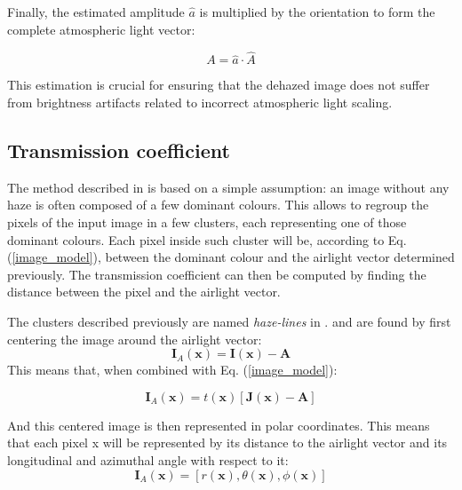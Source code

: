 \documentclass[conference]{IEEEtran}
\begin{document}
Finally, the estimated amplitude \( \hat{a} \) is multiplied by the orientation to form the complete atmospheric light vector:

\begin{equation}
\label{airlight}
A = \hat{a} \cdot \hat{A}
\end{equation}

This estimation is crucial for ensuring that the dehazed image does not suffer from brightness artifacts related to incorrect atmospheric light scaling.

\subsection{Transmission coefficient}
\label{EmmeranPart}
The method described in \cite{dehaze} is based on a simple assumption: an image without any haze is often composed of a few dominant colours. This allows to regroup the pixels of the input image in a few clusters, each representing one of those dominant colours. Each pixel inside such cluster will be, according to Eq. (\ref{image_model}), between the dominant colour and the airlight vector determined previously. The transmission coefficient can then be computed by finding the distance between the pixel and the airlight vector.\par
The clusters described previously are named \textit{haze-lines} in \cite{dehaze}. and are found by first centering the image around the airlight vector:
\begin{equation}
    \label{eq:centered_image}
    \mathbf{I}_A(\mathbf{x}) = \mathbf{I}(\mathbf{x}) - \mathbf{A}
\end{equation}
This means that, when combined with Eq. (\ref{image_model}):

\begin{equation}
    \label{eq:centered_image_model}
    \mathbf{I}_A(\mathbf{x}) = t(\mathbf{x}) \left[\mathbf{J}(\mathbf{x}) - \mathbf{A}\right]
\end{equation}

And this centered image is then represented in polar coordinates. This means that each pixel x will be represented by its distance to the airlight vector and its longitudinal and azimuthal angle with respect to it:
\begin{equation}
    \label{eq:polar_coordinates}
    \mathbf{I}_A(\mathbf{x}) = \left[r(\mathbf{x}), \theta(\mathbf{x}), \phi(\mathbf{x})\right]
\end{equation}
\end{document}
